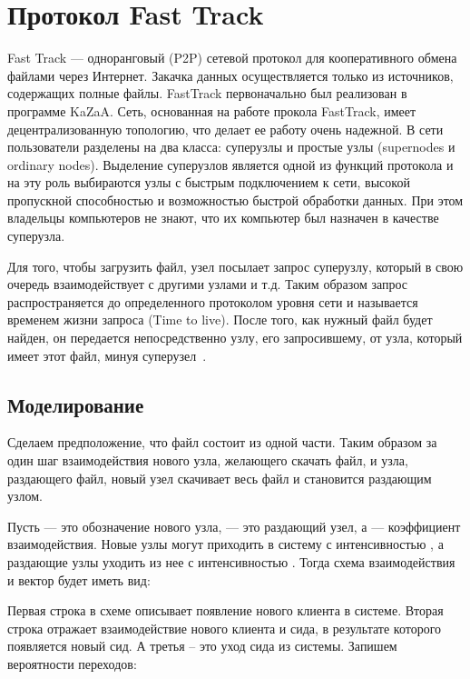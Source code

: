 \documentclass[floatfix,
showkeys,
twocolumn, nofootinbib, superscriptaddress, ]{revtex4-1}
\begin{document}
\section{Протокол Fast Track}

  Fast Track --- одноранговый (P2P) сетевой протокол для
  кооперативного обмена файлами через Интернет. Закачка данных
  осуществляется только из источников, содержащих полные
  файлы. FastTrack первоначально был реализован в программе
  KaZaA. Сеть, основанная на работе прокола FastTrack, имеет
  децентрализованную топологию, что делает ее работу очень надежной. В
  сети пользователи разделены на два класса: суперузлы и простые узлы
  (supernodes и ordinary nodes). Выделение суперузлов является одной
  из функций протокола и на эту роль выбираются узлы с быстрым
  подключением к сети, высокой пропускной способностью и возможностью
  быстрой обработки данных. При этом владельцы компьютеров не знают,
  что их компьютер был назначен в качестве суперузла.

  Для того, чтобы загрузить файл, узел посылает запрос суперузлу,
  который в свою очередь взаимодействует с другими узлами и т.д. Таким
  образом запрос распространяется до определенного протоколом уровня
  сети и называется временем жизни запроса (Time to live). После того,
  как нужный файл будет найден, он передается непосредственно узлу,
  его запросившему, от узла, который имеет этот файл, минуя
  суперузел~\cite{ft1, ft2}.

  \subsection{Моделирование}

  Сделаем предположение, что файл состоит из одной части. Таким
  образом за один шаг взаимодействия нового узла, желающего скачать
  файл, и узла, раздающего файл, новый узел скачивает весь файл и
  становится раздающим узлом.

  Пусть  --- это обозначение нового узла,  --- это раздающий
  узел, а  --- коэффициент взаимодействия. Новые узлы могут
  приходить в систему с интенсивностью , а раздающие узлы
  уходить из нее с интенсивностью . Тогда схема взаимодействия и
  вектор  будет иметь вид:


  Первая строка в схеме описывает появление нового клиента в
  системе. Вторая строка отражает взаимодействие нового клиента и
  сида, в результате которого появляется новый сид. А третья – это
  уход сида из системы.
  Запишем вероятности переходов:
\end{document}
